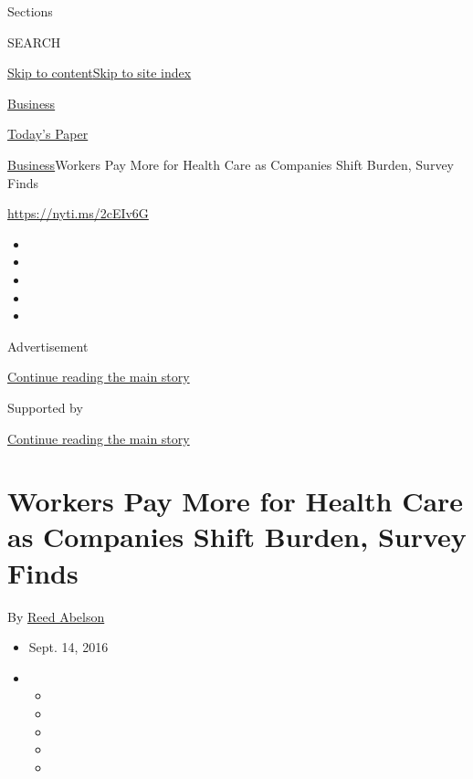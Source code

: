 Sections

SEARCH

\protect\hyperlink{site-content}{Skip to
content}\protect\hyperlink{site-index}{Skip to site index}

\href{https://www.nytimes.com/section/business}{Business}

\href{https://myaccount.nytimes.com/auth/login?response_type=cookie\&client_id=vi}{}

\href{https://www.nytimes.com/section/todayspaper}{Today's Paper}

\href{/section/business}{Business}\textbar{}Workers Pay More for Health
Care as Companies Shift Burden, Survey Finds

\url{https://nyti.ms/2cEIv6G}

\begin{itemize}
\item
\item
\item
\item
\item
\end{itemize}

Advertisement

\protect\hyperlink{after-top}{Continue reading the main story}

Supported by

\protect\hyperlink{after-sponsor}{Continue reading the main story}

\hypertarget{workers-pay-more-for-health-care-as-companies-shift-burden-survey-finds}{%
\section{Workers Pay More for Health Care as Companies Shift Burden,
Survey
Finds}\label{workers-pay-more-for-health-care-as-companies-shift-burden-survey-finds}}

By \href{http://www.nytimes.com/by/reed-abelson}{Reed Abelson}

\begin{itemize}
\item
  Sept. 14, 2016
\item
  \begin{itemize}
  \item
  \item
  \item
  \item
  \item
  \end{itemize}
\end{itemize}

